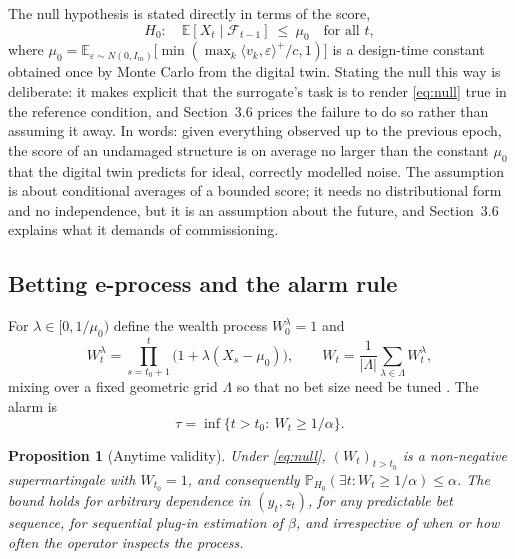 \documentclass[12pt,a4paper]{article}
\newcommand{\rev}[1]{#1}
\newcommand{\rev}[1]{{\color{revcol}#1}}
\newtheorem{proposition}{Proposition}
\newcommand{\E}{\mathbb{E}}
\newcommand{\Prob}{\mathbb{P}}
\newcommand{\F}{\mathcal{F}}
\begin{document}
The null hypothesis is stated directly in terms of the score,
\begin{equation}
H_0:\quad \E[X_t\mid \F_{t-1}]\ \le\ \mu_0 \quad\text{for all } t,
\label{eq:null}
\end{equation}
where $\mu_0=\E_{\varepsilon\sim N(0,I_m)}\big[\min(\max_k\langle v_k,\varepsilon\rangle^+/c,1)\big]$ is a design-time constant obtained once by Monte Carlo from the digital twin. Stating the null this way is deliberate: it makes explicit that the surrogate's task is to render \eqref{eq:null} true in the reference condition, and Section~3.6 prices the failure to do so rather than assuming it away. \rev{In words: given everything observed up to the previous epoch, the score of an undamaged structure is on average no larger than the constant $\mu_0$ that the digital twin predicts for ideal, correctly modelled noise. The assumption is about conditional averages of a bounded score; it needs no distributional form and no independence, but it is an assumption about the future, and Section~3.6 explains what it demands of commissioning.}

\subsection{Betting e-process and the alarm rule}\label{sec:eprocess}

For $\lambda\in[0,1/\mu_0)$ define the wealth process $W_0^\lambda=1$ and
\begin{equation}
W_t^\lambda=\prod_{s=t_0+1}^{t}\big(1+\lambda(X_s-\mu_0)\big),
\qquad
W_t=\frac{1}{|\Lambda|}\sum_{\lambda\in\Lambda}W_t^\lambda ,
\label{eq:wealth}
\end{equation}
mixing over a fixed geometric grid $\Lambda$ so that no bet size need be tuned \citep{waudbysmith2024betting}. The alarm is
\begin{equation}
\tau=\inf\{t> t_0:\ W_t\ge 1/\alpha\}.
\label{eq:alarm}
\end{equation}

\begin{proposition}[Anytime validity]\label{prop:valid}
Under \eqref{eq:null}, $(W_t)_{t>t_0}$ is a non-negative supermartingale with $W_{t_0}=1$, and consequently $\Prob_{H_0}(\exists t: W_t\ge1/\alpha)\le\alpha$. The bound holds for arbitrary dependence in $(y_t,z_t)$, for any predictable bet sequence, for sequential plug-in estimation of $\hat\beta$, and irrespective of when or how often the operator inspects the process.
\end{proposition}
\end{document}
